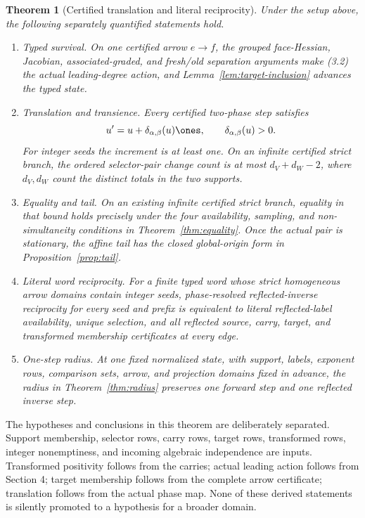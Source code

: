 \documentclass[11pt]{article}
\newtheorem{theorem}{Theorem}[section]
\theoremstyle{definition}
\theoremstyle{remark}
\begin{document}
\begin{theorem}[Certified translation and literal reciprocity]
\label{thm:main}
Under the setup above, the following separately quantified statements hold.
\begin{enumerate}[label=(\Alph*)]
\item \emph{Typed survival.}  On one certified arrow
\(e\to f\), the grouped face-Hessian, Jacobian, associated-graded, and
fresh/old separation arguments make (3.2) the actual leading-degree action,
and Lemma~\ref{lem:target-inclusion} advances the typed state.
\item \emph{Translation and transience.}  Every certified two-phase step
satisfies
\[
 u'=u+\delta_{\alpha,\beta}(u)\ones,\qquad
 \delta_{\alpha,\beta}(u)>0.
\]
For integer seeds the increment is at least one.  On an infinite certified
strict branch, the ordered selector-pair change count is at most
\(d_V+d_W-2\), where \(d_V,d_W\) count the distinct totals in the two
supports.
\item \emph{Equality and tail.}  On an existing infinite certified strict
branch, equality in that bound holds precisely under the four availability,
sampling, and non-simultaneity conditions in
Theorem~\ref{thm:equality}.  Once the actual pair is stationary, the affine
tail has the closed global-origin form in Proposition~\ref{prop:tail}.
\item \emph{Literal word reciprocity.}  For a finite typed word whose
strict homogeneous arrow domains contain integer seeds, phase-resolved
reflected-inverse reciprocity for every seed and prefix is equivalent to
literal reflected-label availability, unique selection, and all reflected
source, carry, target, and transformed membership certificates at every
edge.
\item \emph{One-step radius.}  At one fixed normalized state, with support,
labels, exponent rows, comparison sets, arrow, and projection domains fixed
in advance, the radius in Theorem~\ref{thm:radius} preserves one forward
step and one reflected inverse step.
\end{enumerate}
\end{theorem}

The hypotheses and conclusions in this theorem are deliberately separated.
Support membership, selector rows, carry rows, target rows, transformed
rows, integer nonemptiness, and incoming algebraic independence are inputs.
Transformed positivity follows from the carries; actual leading action
follows from Section 4; target membership follows from the complete arrow
certificate; translation follows from the actual phase map.  None of these
derived statements is silently promoted to a hypothesis for a broader
domain.
\end{document}

